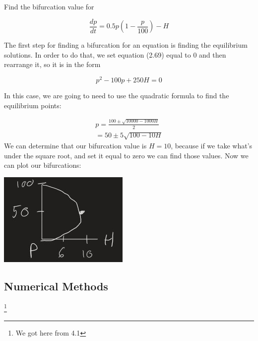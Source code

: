   \begin{problem}
    Find the bifurcation value for 

    \[
      \frac{dp}{dt}=0.5p\left(1-\frac{p}{100}\right)-H
    \]

    The first step for finding a bifurcation for an equation is finding the equilibrium solutions. In order to do that, we set equation (2.69) equal to 0 and then rearrange it, so it is in the form

    \[
      p^2-100p+250H=0
    \]

    In this case, we are going to need to use the quadratic formula to find the equilibrium points:

    \begin{align*}
      p=\frac{100\pm\sqrt{10000-1000H}}{2}\\
      =50\pm5\sqrt{100-10H}
    \end{align*}
    We can determine that our bifurcation value is $H=10$, because if we take what's under the square root, and set it equal to zero we can find those values.
    Now we can plot our bifurcations:
    \begin{center}
      \includegraphics{resource/images/2.7 Example 3 1.jpg}
    \end{center}
  \end{problem}
  \subsection{Numerical Methods}\footnote{We got here from 4.1}
